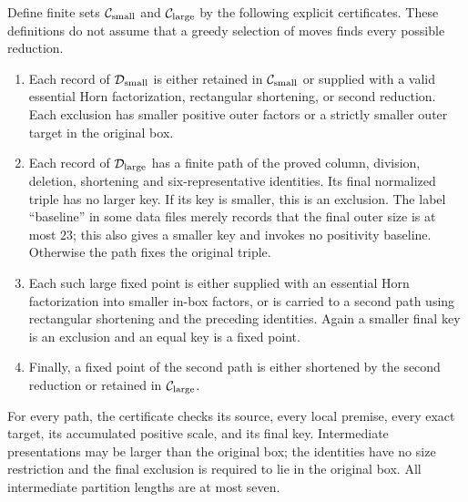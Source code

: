 \documentclass[11pt]{article}
\begin{document}
Define finite sets $\mathcal C_{\rm small}$ and
$\mathcal C_{\rm large}$ by the following explicit certificates.
These definitions do not assume that a greedy selection of moves finds
every possible reduction.
\begin{enumerate}
\item Each record of $\mathcal D_{\rm small}$ is either retained in
$\mathcal C_{\rm small}$ or supplied with a valid essential Horn
factorization, rectangular shortening, or second reduction. Each
exclusion has smaller positive outer factors or a strictly smaller
outer target in the original box.
\item Each record of $\mathcal D_{\rm large}$ has a finite path of
the proved column, division, deletion, shortening and six-representative
identities. Its final normalized triple has no larger key. If its key
is smaller, this is an exclusion. The label ``baseline'' in some data
files merely records that the final outer size is at most $23$;
this also gives a smaller key and invokes no positivity baseline.
Otherwise the path fixes the original triple.
\item Each such large fixed point is either supplied with an essential
Horn factorization into smaller in-box factors, or is carried to a
second path using rectangular shortening and the preceding identities.
Again a smaller final key is an exclusion and an equal key is a fixed point.
\item Finally, a fixed point of the second path is either shortened
by the second reduction or retained in $\mathcal C_{\rm large}$.
\end{enumerate}
For every path, the certificate checks its source, every local premise,
every exact target, its accumulated positive scale, and its final key.
Intermediate presentations may be larger than the original box;
the identities have no size restriction and the final exclusion is
required to lie in the original box. All intermediate partition lengths
are at most seven.
\end{document}
